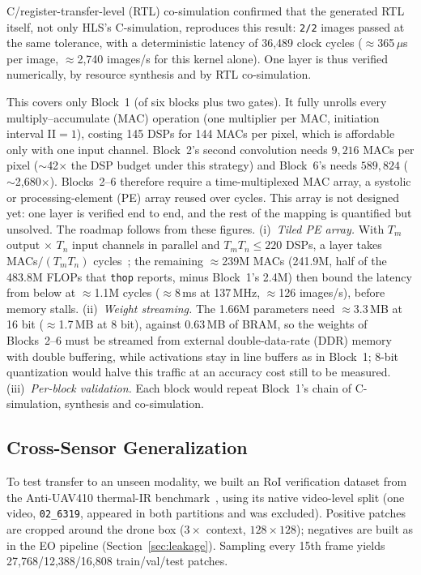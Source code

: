 \documentclass[pdflatex,sn-mathphys-num,iicol]{sn-jnl}%
\begin{document}
C/register-transfer-level (RTL) co-simulation confirmed that the generated
RTL itself, not only HLS's C-simulation, reproduces this result:
\texttt{2/2} images passed at the same tolerance, with a deterministic
latency of 36{,}489 clock cycles ($\approx$365\,$\mu$s per image,
$\approx$2{,}740 images/s for this kernel alone). One layer is thus
verified numerically, by resource synthesis and by RTL co-simulation.

  This covers only Block~1 (of six blocks plus two gates). It fully unrolls
every multiply--accumulate (MAC) operation (one multiplier per MAC,
initiation interval II$=1$), costing 145 DSPs for 144 MACs per pixel, which
is affordable only with one input channel. Block~2's second convolution
needs $9{,}216$ MACs per pixel ($\sim$42$\times$ the DSP budget under this
strategy) and Block~6's needs $589{,}824$ ($\sim$2{,}680$\times$). Blocks~2--6
therefore require a time-multiplexed MAC array, a systolic or
processing-element (PE) array reused over cycles. This array is not
designed yet: one layer is verified end to end, and the rest of the mapping
is quantified but unsolved. The roadmap follows from these figures.
(i)~\emph{Tiled PE array.} With $T_m$ output $\times$ $T_n$ input channels in
parallel and $T_mT_n\le 220$ DSPs, a layer takes MACs$/(T_mT_n)$
cycles~\cite{zhang2015fpga}; the remaining $\approx$239M MACs (241.9M, half of the
483.8M FLOPs that \texttt{thop} reports, minus Block~1's 2.4M) then bound the latency
from below at $\approx$1.1M cycles ($\approx$8\,ms at 137\,MHz, $\approx$126
images/s), before memory stalls. (ii)~\emph{Weight streaming.} The 1.66M
parameters need $\approx$3.3\,MB at 16 bit ($\approx$1.7\,MB at 8 bit),
against 0.63\,MB of BRAM, so the weights of Blocks~2--6 must be streamed from
external double-data-rate (DDR) memory with double buffering, while
activations stay in line buffers as in Block~1; 8-bit quantization would halve
this traffic at an accuracy cost still to be measured.
(iii)~\emph{Per-block validation.} Each block would repeat Block~1's chain of
C-simulation, synthesis and co-simulation.

\subsection{Cross-Sensor Generalization}\label{sec:crosssensor}

 To test transfer to an unseen modality, we built an RoI verification
dataset from the Anti-UAV410 thermal-IR benchmark~\cite{antiuav410}, using
its native video-level split (one video, \texttt{02\_6319}, appeared in both
partitions and was excluded). Positive patches are cropped around the
drone box ($3\times$ context, $128\times128$); negatives are built as in the EO
pipeline (Section~\ref{sec:leakage}). Sampling every 15th frame yields
27{,}768/12{,}388/16{,}808 train/val/test patches.
\end{document}
